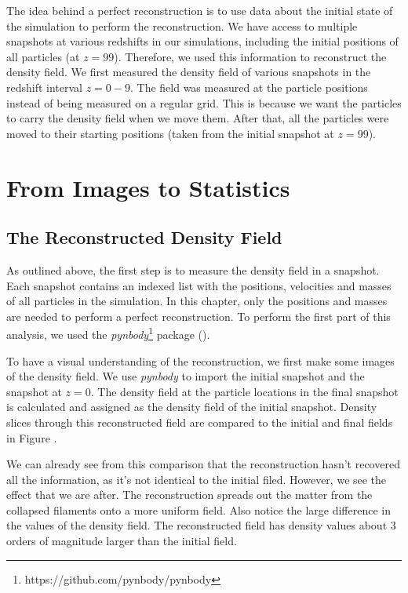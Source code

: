 
The idea behind a perfect reconstruction is to use data about the initial state of the simulation to perform the reconstruction. We have access to multiple snapshots at various redshifts in our simulations, including the initial positions of all particles (at $z = 99$). Therefore, we used this information to reconstruct the density field. We first measured the density field of various snapshots in the redshift interval $z = 0 - 9$. The field was measured at the particle positions instead of being measured on a regular grid. This is because we want the particles to carry the density field when we move them. After that, all the particles were moved to their starting positions (taken from the initial snapshot at $z = 99$).




\section{From Images to Statistics}


\subsection{The Reconstructed Density Field}

As outlined above, the first step is to measure the density field in a snapshot. Each snapshot contains an indexed list with the positions, velocities and masses of all particles in the simulation. In this chapter, only the positions and masses are needed to perform a perfect reconstruction. To perform the first part of this analysis, we used the \textit{pynbody}\footnote{https://github.com/pynbody/pynbody} package (\cite{2013ascl.soft05002P}). 

To have a visual understanding of the reconstruction, we first make some images of the density field. We use \textit{pynbody} to import the initial snapshot and the snapshot at $z=0$. The density field at the particle locations in the final snapshot is calculated and assigned as the density field of the initial snapshot. Density slices through this reconstructed field are compared to the initial and final fields in Figure . 

We can already see from this comparison that the reconstruction hasn't recovered all the information, as it's not identical to the initial filed. However, we see the effect that we are after. The reconstruction spreads out the matter from the collapsed filaments onto a more uniform field. Also notice the large difference in the values of the density field. The reconstructed field has density values about 3 orders of magnitude larger than the initial field. 

